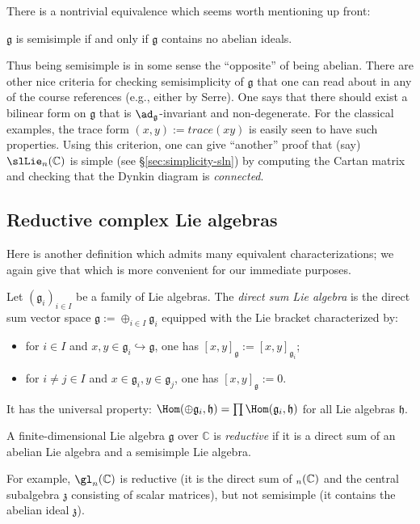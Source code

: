 \documentclass[reqno]{amsart} 
\begin{document}
There is a nontrivial equivalence which seems worth mentioning up front:
\begin{theorem}
  $\mathfrak{g}$ is semisimple if and only if $\mathfrak{g}$ contains no abelian ideals.
\end{theorem}
Thus being semisimple is in some sense the ``opposite'' of being abelian.  There are other nice criteria for checking semisimplicity of $\mathfrak{g}$ that one can read about in any of the course references (e.g., either by Serre).  One says that there should exist a bilinear form on $\mathfrak{g}$ that is $\ad_\mathfrak{g}$-invariant and non-degenerate.  For the classical examples, the trace form $(x,y) := trace(xy)$ is easily seen to have such properties.  Using this criterion, one can give ``another'' proof that (say) $\slLie_n(\mathbb{C})$ is simple (see \S\ref{sec:simplicity-sln}) by computing the Cartan matrix and checking that the Dynkin diagram is \emph{connected}.

\subsection{Reductive complex Lie algebras}
\label{sec:orgdfba908}
Here is another definition which admits many equivalent characterizations; we again give that which is more convenient for our immediate purposes.
\begin{definition}
  Let $(\mathfrak{g}_i)_{i \in I}$ be a family of Lie algebras.  The \emph{direct sum Lie algebra} is the direct sum vector space $\mathfrak{g} := \oplus_{i \in I} \mathfrak{g}_i$ equipped with the Lie bracket characterized by:
  \begin{itemize}
  \item for $i \in I$ and $x,y \in \mathfrak{g}_i \hookrightarrow \mathfrak{g}$, one has $[x,y]_{\mathfrak{g}} := [x,y]_{\mathfrak{g}_i}$;
  \item for $i \neq j \in I$ and $x \in \mathfrak{g}_i, y \in \mathfrak{g}_j$, one has $[x,y]_{\mathfrak{g}} := 0$.
  \end{itemize}
  It has the universal property: $\Hom(\oplus \mathfrak{g}_i, \mathfrak{h}) = \prod \Hom(\mathfrak{g}_i,\mathfrak{h})$ for all Lie algebras $\mathfrak{h}$.
\end{definition}
\begin{definition}
  A finite-dimensional Lie algebra $\mathfrak{g}$ over $\mathbb{C}$ is \emph{reductive} if it is a direct sum of an abelian Lie algebra and a semisimple Lie algebra.
\end{definition}
For example, $\gl_n(\mathbb{C})$ is reductive (it is the direct sum of $\sl_n(\mathbb{C})$ and the central subalgebra $\mathfrak{z}$ consisting of scalar matrices), but not semisimple (it contains the abelian ideal $\mathfrak{z}$).
\end{document}
